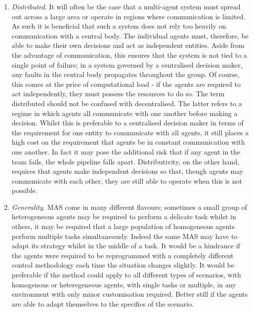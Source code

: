 \documentclass[.../main.tex]{subfiles}
\begin{document}
\begin{enumerate}
    \item {\em Distributed}. It will often be the case that a
      multi-agent system must spread out across a large area or
      operate in regions where communication is limited. As such it is
      beneficial that such a system does not rely too heavily on
      communication with a central body. The individual agents must,
      therefore, be able to make their own decisions and act as
      independent entities.  Aside from the advantage of
      communication, this ensures that the system is not tied to a
      single point of failure; in a system governed by a centralised
      decision maker, any faults in the central body propagates
      throughout the group. Of course, this comes at the price of
      computational load - if the agents are required to act
      independently, they must possess the resources to do so. The
      term distributed should not be confused with decentralised. The
      latter refers to a regime in which agents all communicate with
      one another before making a decision.  Whilst this is preferable
      to a centralised decision maker in terms of the requirement for
      one entity to communicate with all agents, it still places a
      high cost on the requirement that agents be in constant
      communication with one another. In fact it may pose the
      additional risk that if any agent in the team fails, the whole
      pipeline falls apart. Distributivity, on the other hand,
      requires that agents make independent decisions so that, though
      agents may communicate with each other, they are still able to
      operate when this is not possible.

    \item {\em Generality}. MAS come in many different flavours; sometimes a
      small group of heterogeneous
      agents may be required to perform a delicate task
      whilst in others, it may be required that a large population of
      homogeneous
      agents perform multiple tasks
      simultaneously. Indeed the same MAS may have to adapt its
      strategy whilst in the middle of a task. It would be a hindrance
      if the agents were required to be reprogrammed with a completely
      different control methodology each time the situation changes
      slightly. It would be preferable if the method could apply to
      all different types of scenarios, with homogenous or
      heteregeneous agents, with single tasks or multiple, in any
      environment with only minor customisation required. Better still
      if the agents are able to adapt themselves to the specifics of
      the scenario.


\end{enumerate}
\end{document}
